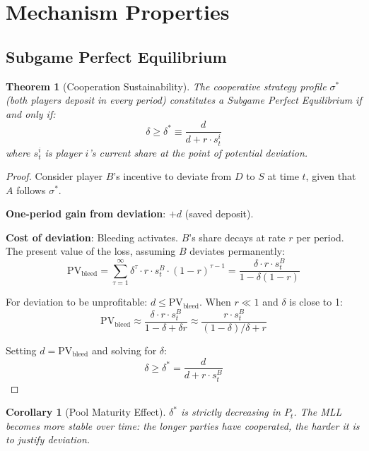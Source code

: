 \documentclass[12pt,a4paper]{article}
\newtheorem{theorem}{Theorem}
\newtheorem{corollary}{Corollary}
\begin{document}

\section{Mechanism Properties}
\label{sec:properties}

\subsection{Subgame Perfect Equilibrium}

\begin{theorem}[Cooperation Sustainability]
\label{thm:cooperation}
The cooperative strategy profile $\sigma^*$ (both players deposit in every period) constitutes a Subgame Perfect Equilibrium if and only if:
\[
\delta \geq \delta^* \equiv \frac{d}{d + r \cdot s_t^i}
\]
where $s_t^i$ is player $i$'s current share at the point of potential deviation.
\end{theorem}

\begin{proof}
Consider player $B$'s incentive to deviate from $D$ to $S$ at time $t$, given that $A$ follows $\sigma^*$.

\textbf{One-period gain from deviation}: $+d$ (saved deposit).

\textbf{Cost of deviation}: Bleeding activates. $B$'s share decays at rate $r$ per period. The present value of the loss, assuming $B$ deviates permanently:
\[
\text{PV}_{\text{bleed}} = \sum_{\tau=1}^{\infty} \delta^\tau \cdot r \cdot s_t^B \cdot (1-r)^{\tau-1}
= \frac{\delta \cdot r \cdot s_t^B}{1 - \delta(1-r)}
\]

For deviation to be unprofitable: $d \leq \text{PV}_{\text{bleed}}$. When $r \ll 1$ and $\delta$ is close to 1:
\[
\text{PV}_{\text{bleed}} \approx \frac{\delta \cdot r \cdot s_t^B}{1 - \delta + \delta r} \approx \frac{r \cdot s_t^B}{(1-\delta)/\delta + r}
\]

Setting $d = \text{PV}_{\text{bleed}}$ and solving for $\delta$:
\[
\delta \geq \delta^* = \frac{d}{d + r \cdot s_t^B}
\]
\end{proof}

\begin{corollary}[Pool Maturity Effect]
\label{cor:maturity}
$\delta^*$ is strictly decreasing in $P_t$. The MLL becomes more stable over time: the longer parties have cooperated, the harder it is to justify deviation.
\end{corollary}
\end{document}
